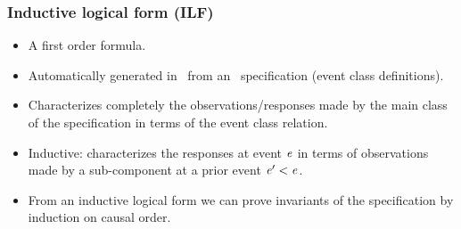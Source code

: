 \documentclass[12pt,red]{beamer}
\begin{document}
\begin{frame}
  \frametitle{Inductive logical form (ILF)}

  \begin{itemize}
  \item A first order formula.

  \item Automatically generated in \nuprl\ from an
    \eml\ specification (event class definitions).

  \item Characterizes completely the observations/responses made by
    the main class of the specification in terms of the event class
    relation.

  \item Inductive: characterizes the responses at event $\mathit{e}$
    in terms of observations made by a sub-component at a prior event
    $\mathit{e}'<\mathit{e}$.

  \item From an inductive logical form we can prove invariants of the
    specification by induction on causal order.
  \end{itemize}
\end{frame}
\end{document}
